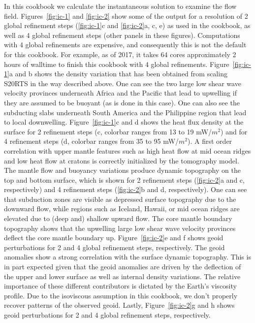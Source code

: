 \documentclass{article}
\begin{document}
In this cookbook we calculate the instantaneous solution to examine the flow
field. Figures~\ref{fig:ic-1} and \ref{fig:ic-2} show some of the output
for a resolution of 2 global refinement steps (\ref{fig:ic-1}c and
\ref{fig:ic-2}a, c, e) as used in the cookbook, as well as 4 global
refinement steps (other panels in these figures). Computations with 4 global
refinements are expensive, and consequently this is not the
default for this cookbook. For example, as of 2017, it takes 64 cores approximately
2 hours of walltime to finish this cookbook with 4 global refinements.
Figure~\ref{fig:ic-1}a and b shows the density variation
that has been obtained from scaling S20RTS in the way described above.
One can see the two large low shear wave velocity provinces
underneath Africa and the Pacific that lead to upwelling if they are assumed to
be buoyant (as is done in this case). One can also see the subducting slabs
underneath South America and the Philippine region that lead to local downwelling.
Figure~\ref{fig:ic-1}c and d shows the heat flux density at the surface for
2 refinement steps (c, colorbar ranges from 13 to 19 mW/$m^2$) and for
4 refinement steps (d, colorbar ranges from 35 to 95 mW/$m^2$). A first order correlation
with upper mantle features such as high heat flow at mid ocean ridges and low
heat flow at cratons is correctly initialized by the tomography model.
The mantle flow and buoyancy variations produce dynamic topography on the
top and bottom surface, which is shown for 2 refinement steps (\ref{fig:ic-2}a and c, respectively)
and 4 refinement steps (\ref{fig:ic-2}b and d, respectively).
One can see that subduction zones are visible as depressed surface topography
due to the downward flow, while regions such as Iceland, Hawaii, or mid ocean
ridges are elevated due to (deep and) shallow upward flow. The core mantle boundary
topography shows that the upwelling large low shear wave velocity
provinces deflect the core mantle boundary up. Figure~\ref{fig:ic-2}e and
f shows geoid perturbations for 2 and 4 global refinement steps, respectively.
The geoid anomalies show a strong correlation with the surface dynamic topography.
This is in part expected given that the geoid anomalies are driven by the
deflection of the upper and lower surface
as well as internal density variations. The relative importance of these different
contributors is dictated by the Earth's viscosity profile. Due to the isoviscous
assumption in this cookbook, we don't properly recover patterns of the observed
geoid. Lastly, Figure~\ref{fig:ic-2}g and h shows geoid perturbations for 2 and 4
global refinement steps, respectively.
\end{document}
